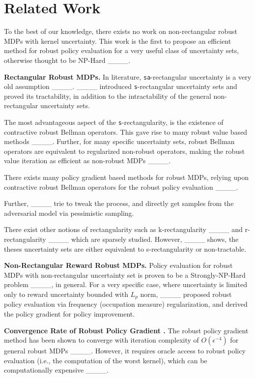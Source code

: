 \section{Related Work}
To the best of our knowledge, there exists no work on non-rectangular robust MDPs with kernel uncertainty. This work is the first to propose an efficient method for robust policy evaluation for a very useful class of uncertainty sets, otherwise thought to be NP-Hard ____.

\textbf{Rectangular Robust MDPs.} In literature, \texttt{sa}-rectangular uncertainty is a very old assumption ____. ____ introduced \texttt{s}-rectangular uncertainty sets and proved its tractability, in addition to the intractability of the general non-rectangular uncertainty sets. 

The most advantageous aspect of the \texttt{s}-rectangularity, is the existence of contractive robust Bellman operators. This gave rise to many robust value based methods ____. Further, for many specific uncertainty sets, robust Bellman operators are equivalent to regularized non-robust operators, making the robust value iteration as efficient as non-robust MDPs ____.  

There exists many policy gradient based methods for robust MDPs, relying upon contractive robust Bellman operators for the robust policy evaluation ____.

Further, ____ trie to tweak the process, and directly get samples from the adversarial model via pessimistic sampling. 


There exist other notions of rectangularity such as k-rectangularity ____ and r-rectangularity ____ which are sparsely studied. However, ____ shows, the theses uncertainty sets are either equivalent to s-rectangularity or non-tractable.

\textbf{Non-Rectangular Reward Robust MDPs. } 
Policy evaluation for robust MDPs with non-rectangular uncertainty set is proven to be a Strongly-NP-Hard problem ____, in general. For a very specific case, where uncertainty is limited only to reward uncertainty bounded with $L_p$ norm, ____ proposed robust policy evaluation via frequency (occupation measure) regularization, and derived the policy gradient for policy improvement. 

\textbf{Convergence Rate of Robust Policy Gradient .} The robust policy gradient method has been shown to converge with iteration complexity of \(O(\epsilon^{-4})\) for general robust MDPs ____. However, it requires oracle access to robust policy evaluation (i.e., the computation of the worst kernel), which can be computationally expensive ____.